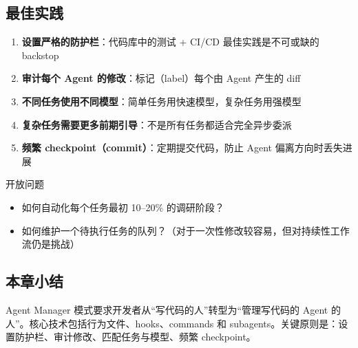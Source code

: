\subsection{最佳实践}

\begin{enumerate}
    \item \textbf{设置严格的防护栏}：代码库中的测试 + CI/CD 最佳实践是不可或缺的 backstop
    \item \textbf{审计每个 Agent 的修改}：标记（label）每个由 Agent 产生的 diff
    \item \textbf{不同任务使用不同模型}：简单任务用快速模型，复杂任务用强模型
    \item \textbf{复杂任务需要更多前期引导}：不是所有任务都适合完全异步委派
    \item \textbf{频繁 checkpoint（commit）}：定期提交代码，防止 Agent 偏离方向时丢失进展
\end{enumerate}

\begin{warningbox}{开放问题}
\begin{itemize}
    \item 如何自动化每个任务最初 10--20\% 的调研阶段？
    \item 如何维护一个待执行任务的队列？（对于一次性修改较容易，但对持续性工作流仍是挑战）
\end{itemize}
\end{warningbox}

\subsection{本章小结}

Agent Manager 模式要求开发者从``写代码的人''转型为``管理写代码的 Agent 的人''。核心技术包括行为文件、hooks、commands 和 subagents。关键原则是：设置防护栏、审计修改、匹配任务与模型、频繁 checkpoint。

